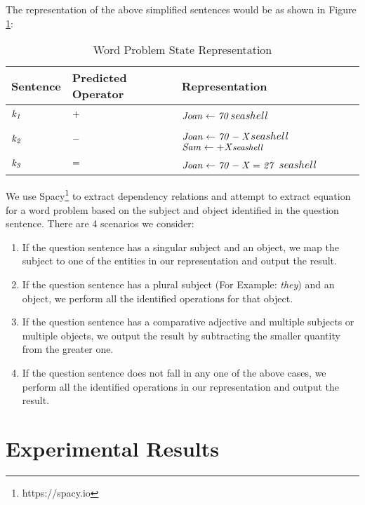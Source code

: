 \documentclass[11pt]{article}
\begin{document}
\vspace{0.25cm}
The representation of the above simplified sentences would be as shown in Figure \ref{figure:12}:
\begin{table}[h!]
\centering
\begin{tabular}{ |p{1.3cm}|p{1.7cm}|p{3.7cm}| }
\hline
\textbf{\small Sentence} & \textbf{\small Predicted Operator} & \textbf{\small Representation} \\ \hline
$\mathit{\small k_{1}}$ & $\mathit{\small +}$ & $\mathit{\small Joan \leftarrow 70}$\textit{\small seashell} \\ \hline
$\mathit{\small k_{2}}$ & $\mathit{\small -}$ & $\mathit{\small Joan \leftarrow 70 - X}$\textit{\small seashell} $\mathit{\small Sam \leftarrow +X}\textit{\small seashell}$ \\ \hline
$\mathit{\small k_{3}}$ & $\mathit{\small =}$ & $\mathit{\small Joan \leftarrow 70 - X = 27}$ \textit{\small seashell}\\ \hline
\end{tabular}
\caption{Word Problem State Representation}
\label{figure:12}
\end{table}
\vspace{0.25cm}
We use Spacy\footnote{https://spacy.io} to extract dependency relations and attempt to extract equation for a word problem based on the subject and object identified in the question sentence. There are 4 scenarios we consider:
\begin{enumerate}[topsep=0pt,itemsep=-1ex,partopsep=1ex,parsep=1ex]
\item If the question sentence has a singular subject and an object, we map the subject to one of the entities in our representation and output the result.
\item If the question sentence has a plural subject (For Example: \textit{they}) and an object, we perform all the identified operations for that object.
\item If the question sentence has a comparative adjective and multiple subjects or multiple objects, we output the result by subtracting the smaller quantity from the greater one.
\item If the question sentence does not fall in any one of the above cases, we perform all the identified operations in our representation and output the result.
\end{enumerate}


\section{Experimental Results}
\end{document}
